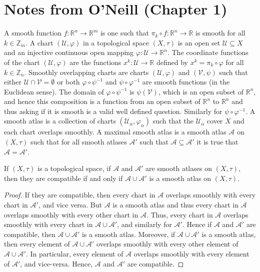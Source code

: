 \section{Notes from O'Neill (Chapter 1)}
    A smooth function $f:\mathbb{R}^{n}\rightarrow\mathbb{R}^{m}$ is one
    such that $\pi_{k}\circ{f}:\mathbb{R}^{n}\rightarrow\mathbb{R}$ is
    smooth for all $k\in\mathbb{Z}_{m}$. A chart $(\mathcal{U},\varphi)$ in
    a topological space $(X,\tau)$ is an open set $\mathcal{U}\subseteq{X}$
    and an injective continuous open mapping
    $\varphi:\mathcal{U}\rightarrow\mathbb{R}^{n}$. The coordinate functions
    of the chart $(\mathcal{U},\varphi)$ are the functions
    $x^{k}:\mathcal{U}\rightarrow\mathbb{R}$ defined by
    $x^{k}=\pi_{k}\circ\varphi$ for all $k\in\mathbb{Z}_{n}$. Smoothly
    overlapping charts are charts $(\mathcal{U},\varphi)$ and
    $(\mathcal{V},\psi)$ such that either
    $\mathcal{U}\cap\mathcal{V}=\emptyset$ or both
    $\varphi\circ\psi^{\minus{1}}$ and $\psi\circ\varphi^{\minus{1}}$ are
    smooth functions (in the Euclidean sense). The domain of
    $\varphi\circ\psi^{\minus{1}}$ is $\psi(\mathcal{V})$, which is an open
    subset of $\mathbb{R}^{n}$, and hence this composition is a function
    from an open subset of $\mathbb{R}^{n}$ to $\mathbb{R}^{n}$ and thus
    asking if it is smooth is a valid well defined question. Similarly for
    $\psi\circ\varphi^{\minus{1}}$. A smooth atlas is a collection of charts
    $(\mathcal{U}_{\alpha},\varphi_{\alpha})$ such that the
    $\mathcal{U}_{\alpha}$ cover $X$ and each chart overlaps smoothly. A
    maximal smooth atlas is a smooth atlas $\mathcal{A}$ on $(X,\tau)$ such
    that for all smooth atlases $\mathcal{A}'$ such that
    $\mathcal{A}\subseteq\mathcal{A}'$ it is true that
    $\mathcal{A}=\mathcal{A}'$.
    \begin{theorem}
        If $(X,\tau)$ is a topological space, if $\mathcal{A}$ and
        $\mathcal{A}'$ are smooth atlases on $(X,\tau)$, then they are
        compatible if and only if $\mathcal{A}\cup\mathcal{A}'$ is a smooth
        atlas on $(X,\tau)$.
    \end{theorem}
    \begin{proof}
        If they are compatible, then every chart in $\mathcal{A}$ overlaps
        smoothly with every chart in $\mathcal{A}'$, and vice versa. But
        $\mathcal{A}$ is a smooth atlas and thus every chart in
        $\mathcal{A}$ overlaps smoothly with every other chart in
        $\mathcal{A}$. Thus, every chart in $\mathcal{A}$ overlaps smoothly
        with every chart in $\mathcal{A}\cup\mathcal{A}'$, and similarly for
        $\mathcal{A}'$. Hence if $\mathcal{A}$ and $\mathcal{A}'$ are
        compatible, then $\mathcal{A}\cup\mathcal{A}'$ is a smooth atlas.
        Moreover, if $\mathcal{A}\cup\mathcal{A}'$ is a smooth atlas, then
        every element of $\mathcal{A}\cup\mathcal{A}'$ overlaps smoothly
        with every other element of $\mathcal{A}\cup\mathcal{A}'$. In
        particular, every element of $\mathcal{A}$ overlaps smoothly with
        every element of $\mathcal{A}'$, and vice-versa. Hence,
        $\mathcal{A}$ and $\mathcal{A}'$ are compatible.
    \end{proof}
